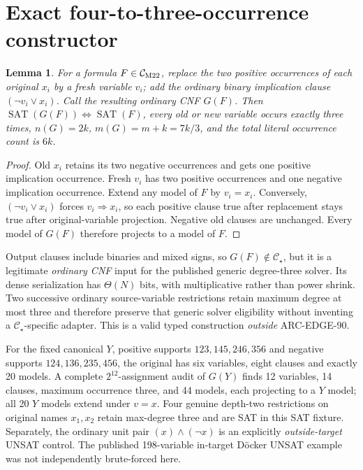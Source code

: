 \documentclass[11pt]{article}
\newtheorem{lemma}{Lemma}
\newcommand{\CS}{\mathcal C_\star}
\begin{document}
\section{Exact four-to-three-occurrence constructor}
\begin{lemma}
For a formula \(F\in\mathcal C_{\rm M22}\), replace the two positive occurrences of each original \(x_i\) by a fresh variable \(v_i\); add the ordinary binary implication clause \((\neg v_i\vee x_i)\). Call the resulting ordinary CNF \(G(F)\). Then \(\operatorname{SAT}(G(F))\iff\operatorname{SAT}(F)\), every old or new variable occurs exactly three times, \(n(G)=2k\), \(m(G)=m+k=7k/3\), and the total literal occurrence count is \(6k\).
\end{lemma}
\begin{proof}
Old \(x_i\) retains its two negative occurrences and gets one positive implication occurrence. Fresh \(v_i\) has two positive occurrences and one negative implication occurrence. Extend any model of \(F\) by \(v_i=x_i\). Conversely, \((\neg v_i\vee x_i)\) forces \(v_i\Rightarrow x_i\), so each positive clause true after replacement stays true after original-variable projection. Negative old clauses are unchanged. Every model of \(G(F)\) therefore projects to a model of \(F\).
\end{proof}
Output clauses include binaries and mixed signs, so \(G(F)\notin\CS\), but it is a legitimate \emph{ordinary CNF} input for the published generic degree-three solver. Its dense serialization has \(\Theta(N)\) bits, with multiplicative rather than power shrink. Two successive ordinary source-variable restrictions retain maximum degree at most three and therefore preserve that generic solver eligibility without inventing a \(\CS\)-specific adapter. This is a valid typed construction \emph{outside} ARC-EDGE-90.

For the fixed canonical \(Y\), positive supports \(123,145,246,356\) and negative supports \(124,136,235,456\), the original has six variables, eight clauses and exactly 20 models. A complete \(2^{12}\)-assignment audit of \(G(Y)\) finds 12 variables, 14 clauses, maximum occurrence three, and 44 models, each projecting to a \(Y\) model; all 20 \(Y\) models extend under \(v=x\). Four genuine depth-two restrictions on original names \(x_1,x_2\) retain max-degree three and are SAT in this SAT fixture. Separately, the ordinary unit pair \((x)\land(\neg x)\) is an explicitly \emph{outside-target} UNSAT control. The published 198-variable in-target D\"ocker UNSAT example was not independently brute-forced here.
\end{document}
